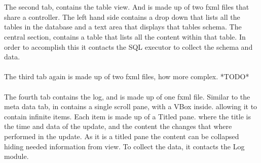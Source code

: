 \\\\
The second tab, contains the table view. And is made up of two fxml files that share a controller. The left hand side contains a drop down that lists all the tables in the database and a text area that displays that tables schema. The central section, contains a table that lists all the content within that table. In order to accomplish this it contacts the SQL executor to collect the schema and data.  
\\\\
The third tab again is made up of two fxml files, how more complex. *TODO*
\\\\
The fourth tab contains the log, and is made up of one fxml file. Similar to the meta data tab, in contains a single scroll pane, with a VBox inside. allowing it to contain infinite items. Each item is made up of a Titled pane. where the title is the time and data of the update, and the content the changes that where performed in the update. As it is a titled pane the content can be collapsed hiding needed information from view. To collect the data, it contacts the Log module.
